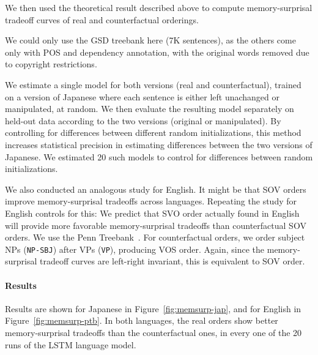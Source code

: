 \documentclass[11pt,a4paper]{article}
\begin{document}
We then used the theoretical result described above to compute memory-surprisal tradeoff curves of real and counterfactual orderings.

We could only use the GSD treebank here (7K sentences), as the others come only with POS and dependency annotation, with the original words removed due to copyright restrictions.

We estimate a single model for both versions (real and counterfactual), trained on a version of Japanese where each sentence is either left unachanged or manipulated, at random.
We then evaluate the resulting model separately on held-out data according to the two versions (original or manipulated).
By controlling for differences between different random initializations, this method increases statistical precision in estimating differences between the two versions of Japanese.
We estimated 20 such models to control for differences between random initializations.

We also conducted an analogous study for English.
It might be that SOV orders improve memory-surprisal tradeoffs across languages.
Repeating the study for English controls for this:
We predict that SVO order actually found in English will provide more favorable memory-surprisal tradeoffs than counterfactual SOV orders.
We use the Penn Treebank~\citep{marcus-building-1993}.
For counterfactual orders, we order subject NPs (\texttt{NP-SBJ}) after VPs (\texttt{VP}), producing VOS order.
Again, since the memory-surprisal tradeoff curves are left-right invariant, this is equivalent to SOV order.


\paragraph{Results}

Results are shown for Japanese in Figure~\ref{fig:memsurp-jap}, and for English in Figure~\ref{fig:memsurp-ptb}.
In both languages, the real orders show better memory-surprisal tradeoffs than the counterfactual ones, in every one of the 20 runs of the LSTM language model.
\end{document}
